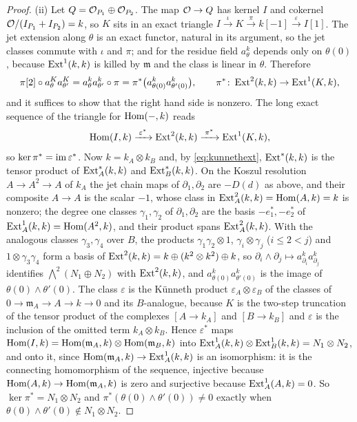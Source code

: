 \begin{proof}
(ii) Let $Q=\mathcal{O}_{P_{1}}\oplus\mathcal{O}_{P_{2}}$. The map $\mathcal{O}\to Q$ has kernel $I$
and cokernel $\mathcal{O}/(I_{P_{1}}+I_{P_{2}})=k$, so $K$ sits in an exact triangle
$I\xrightarrow{\iota}K\xrightarrow{\pi}k[-1]\xrightarrow{\varepsilon}I[1]$.
The jet extension along $\theta$ is an exact functor, natural in its
argument, so the jet classes commute with $\iota$ and $\pi$; and for the
residue field $a^{k}_{\theta}$ depends only on $\theta(0)$, because
$\operatorname{Ext}^{1}(k,k)$ is killed by $\mathfrak m$ and the class is linear in
$\theta$. Therefore
\[
  \pi[2]\circ a^{K}_{\theta}a^{K}_{\theta'}
  =a^{k}_{\theta}a^{k}_{\theta'}\circ\pi
  =\pi^{*}\bigl(a^{k}_{\theta(0)}a^{k}_{\theta'(0)}\bigr),
  \qquad\pi^{*}\colon\operatorname{Ext}^{2}(k,k)\to\operatorname{Ext}^{1}(K,k),
\]
and it suffices to show that the right hand side is nonzero. The long exact
sequence of the triangle for $\operatorname{Hom}(-,k)$ reads
\[
  \operatorname{Hom}(I,k)\xrightarrow{\;\varepsilon^{*}\;}\operatorname{Ext}^{2}(k,k)\xrightarrow{\;\pi^{*}\;}
  \operatorname{Ext}^{1}(K,k),
\]
so $\ker\pi^{*}=\operatorname{im}\varepsilon^{*}$. Now $k=k_{A}\otimes k_{B}$ and, by
\eqref{eq:kunnethext}, $\operatorname{Ext}^{*}(k,k)$ is the tensor product of
$\operatorname{Ext}^{*}_{A}(k,k)$ and $\operatorname{Ext}^{*}_{B}(k,k)$. On the Koszul resolution
$A\to A^{2}\to A$ of $k_{A}$ the jet chain maps of $\partial_{1},\partial_{2}$
are $-D(d)$ as above, and their composite $A\to A$ is the scalar $-1$, whose
class in $\operatorname{Ext}^{2}_{A}(k,k)=\operatorname{Hom}(A,k)=k$ is nonzero; the degree one classes
$\gamma_{1},\gamma_{2}$ of $\partial_{1},\partial_{2}$ are the basis
$-e_{1}^{*},-e_{2}^{*}$ of $\operatorname{Ext}^{1}_{A}(k,k)=\operatorname{Hom}(A^{2},k)$, and their
product spans $\operatorname{Ext}^{2}_{A}(k,k)$. With the analogous classes
$\gamma_{3},\gamma_{4}$ over $B$, the products $\gamma_{1}\gamma_{2}\otimes1$,
$\gamma_{i}\otimes\gamma_{j}$ ($i\le2<j$) and $1\otimes\gamma_{3}\gamma_{4}$
form a basis of $\operatorname{Ext}^{2}(k,k)=k\oplus(k^{2}\otimes k^{2})\oplus k$, so
$\partial_{i}\wedge\partial_{j}\mapsto a^{k}_{\partial_{i}}a^{k}_{\partial_{j}}$
identifies $\bigwedge^{2}(N_{1}\oplus N_{2})$ with $\operatorname{Ext}^{2}(k,k)$, and
$a^{k}_{\theta(0)}a^{k}_{\theta'(0)}$ is the image of $\theta(0)\wedge\theta'(0)$. The
class $\varepsilon$ is the K\"unneth product $\varepsilon_{A}\otimes\varepsilon_{B}$
of the classes of $0\to\mathfrak m_{A}\to A\to k\to0$ and its $B$-analogue,
because $K$ is the two-step truncation of the tensor product of the complexes
$[A\to k_{A}]$ and $[B\to k_{B}]$ and $\varepsilon$ is the inclusion of the
omitted term $k_{A}\otimes k_{B}$. Hence $\varepsilon^{*}$ maps
$\operatorname{Hom}(I,k)=\operatorname{Hom}(\mathfrak m_{A},k)\otimes\operatorname{Hom}(\mathfrak m_{B},k)$ into
$\operatorname{Ext}^{1}_{A}(k,k)\otimes\operatorname{Ext}^{1}_{B}(k,k)=N_{1}\otimes N_{2}$, and onto it,
since $\operatorname{Hom}(\mathfrak m_{A},k)\to\operatorname{Ext}^{1}_{A}(k,k)$ is an isomorphism: it is
the connecting homomorphism of the sequence, injective because
$\operatorname{Hom}(A,k)\to\operatorname{Hom}(\mathfrak m_{A},k)$ is zero and surjective because
$\operatorname{Ext}^{1}_{A}(A,k)=0$. So $\ker\pi^{*}=N_{1}\otimes N_{2}$
and $\pi^{*}(\theta(0)\wedge\theta'(0))\ne0$ exactly when
$\theta(0)\wedge\theta'(0)\notin N_{1}\otimes N_{2}$.
\end{proof}

